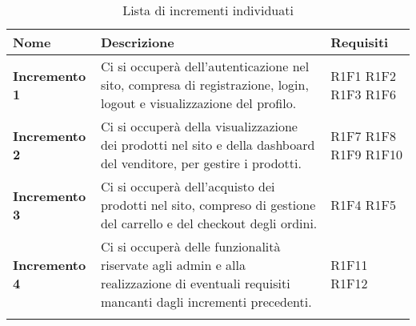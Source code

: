 {


\centering
\renewcommand{\arraystretch}{1.8}
\begin{longtable}{C{3cm} C{8cm} C{3cm} }

\textbf{Nome} &
\textbf{Descrizione}&
\textbf{Requisiti}\\
\endhead

\textbf{Incremento 1} & Ci si occuperà dell'autenticazione nel sito, compresa di registrazione, login, logout e visualizzazione del profilo. & R1F1 \newline R1F2 \newline R1F3 \newline R1F6 \\
\textbf{Incremento 2} & Ci si occuperà della visualizzazione dei prodotti nel sito e della dashboard del venditore, per gestire i prodotti. & R1F7 \newline R1F8 \newline R1F9 \newline R1F10 \\
\textbf{Incremento 3} & Ci si occuperà dell'acquisto dei prodotti nel sito, compreso di gestione del carrello e del checkout degli ordini. & R1F4 \newline R1F5 \\
\textbf{Incremento 4} & Ci si occuperà delle funzionalità riservate agli admin e alla realizzazione di eventuali requisiti mancanti dagli incrementi precedenti. & R1F11 \newline R1F12 \\

\caption{Lista di incrementi individuati}

\end{longtable}
}
